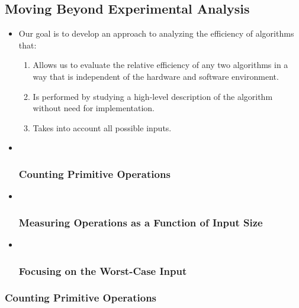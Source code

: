 \documentclass[11pt]{article}
\providecommand{\tightlist}{%
      \setlength{\itemsep}{0pt}\setlength{\parskip}{0pt}}
\begin{document}
    \hypertarget{moving-beyond-experimental-analysis}{%
\subsection{Moving Beyond Experimental
Analysis}\label{moving-beyond-experimental-analysis}}

\begin{itemize}
\item
  Our goal is to develop an approach to analyzing the efficiency of
  algorithms that:

  \begin{enumerate}
  \def\labelenumi{\arabic{enumi}.}
  \tightlist
  \item
    Allows us to evaluate the relative efficiency of any two algorithms
    in a way that is independent of the hardware and software
    environment.
  \item
    Is performed by studying a high-level description of the algorithm
    without need for implementation.
  \item
    Takes into account all possible inputs.
  \end{enumerate}
\item ~
  \hypertarget{counting-primitive-operations}{%
  \subsubsection{Counting Primitive
  Operations}\label{counting-primitive-operations}}
\item ~
  \hypertarget{measuring-operations-as-a-function-of-input-size}{%
  \subsubsection{Measuring Operations as a Function of Input
  Size}\label{measuring-operations-as-a-function-of-input-size}}
\item ~
  \hypertarget{focusing-on-the-worst-case-input}{%
  \subsubsection{Focusing on the Worst-Case
  Input}\label{focusing-on-the-worst-case-input}}
\end{itemize}

    \hypertarget{counting-primitive-operations}{%
\subsubsection{Counting Primitive
Operations}\label{counting-primitive-operations}}
\end{document}

